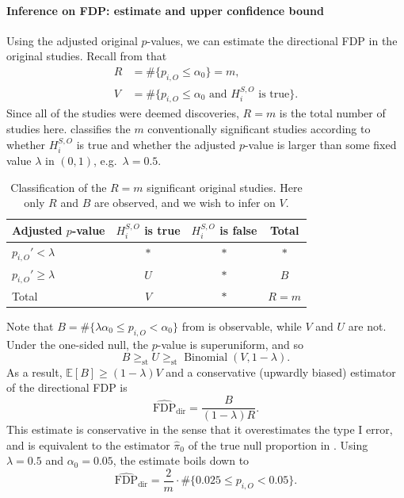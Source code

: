 \documentclass[11pt]{article}
\theoremstyle{definition}
\theoremstyle{custom}
\newcommand{\EE}{\mathbb{E}}
\DeclareMathOperator{\Binomial}{Binomial}
\newcommand{\hFDPd}{\widehat{\text{FDP}}_\text{dir}}
\newcommand{\ao}{\alpha_0}
\newcommand{\gest}{\ge_\text{st}}
\begin{document}
  \paragraph{Inference on FDP: estimate and upper confidence bound} Using the adjusted original $p$-values, we can estimate the directional FDP in the original studies. Recall from  that
  \begin{align*}
    R &= \#\{p_{i,O} \le \ao\} = m,\\
    V &= \#\{p_{i,O} \le \ao \text{ and } H_i^{S,O} \text{ is true}\}.
  \end{align*}
  Since all of the studies were deemed discoveries, $R=m$ is the total number of studies here.  classifies the $m$ conventionally significant studies according to whether $H_i^{S,O}$ is true and whether the adjusted $p$-value is larger than some fixed value $\lambda$ in $(0,1)$, e.g.\ $\lambda = 0.5$.
  \begin{table}[htbp]
    \centering
    \begin{tabular}{lccc}
      \toprule
      Adjusted $p$-value & $H_i^{S,O}$ is true & $H_i^{S,O}$ is false & Total \\
      \midrule
      $p_{i,O}' < \lambda$ & $*$ & $*$ & $*$ \\
      $p_{i,O}' \ge \lambda$ & $U$ & $*$ & $B$ \\
      Total & $V$ & $*$ & $R = m$ \\
      \bottomrule
    \end{tabular}
    \caption{Classification of the $R=m$ significant original studies. Here only $R$ and $B$ are observed, and we wish to infer on $V$.}
  \label{tbl:err-fdp}
  \end{table}

  Note that $B = \#\{\lambda\ao \le p_{i,O} < \ao\}$ from  is observable, while $V$ and $U$ are not. Under the one-sided null, the $p$-value is superuniform, and so 
  \begin{equation}
    B \gest U \gest \Binomial(V, 1-\lambda).
  \label{eq:Bgest}
  \end{equation}
  As a result, $\EE[B] \ge (1-\lambda)V$ and a conservative (upwardly biased) estimator of the directional FDP is
  \[
    \hFDPd = \frac{B}{(1 - \lambda)R}.
  \]
  This estimate is conservative in the sense that it overestimates the type I error, and is equivalent to the estimator $\hat{\pi}_0$ of the true null proportion in \citet{Storey:2002vj}. Using $\lambda = 0.5$ and $\ao = 0.05$, the estimate boils down to
  \[
    \hFDPd = \frac{2}{m} \cdot \#\{0.025 \le p_{i,O} < 0.05\}.
  \]
\end{document}
